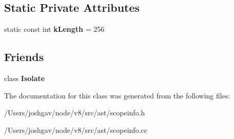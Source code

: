 \subsection*{Static Private Attributes}
\begin{DoxyCompactItemize}
\item 
static const int {\bfseries k\+Length} = 256\hypertarget{classv8_1_1internal_1_1_context_slot_cache_a86ccac5433f64d7cb0663564dd7d8ac3}{}\label{classv8_1_1internal_1_1_context_slot_cache_a86ccac5433f64d7cb0663564dd7d8ac3}

\end{DoxyCompactItemize}
\subsection*{Friends}
\begin{DoxyCompactItemize}
\item 
class {\bfseries Isolate}\hypertarget{classv8_1_1internal_1_1_context_slot_cache_aba4f0964bdacf2bbf62cf876e5d28d0a}{}\label{classv8_1_1internal_1_1_context_slot_cache_aba4f0964bdacf2bbf62cf876e5d28d0a}

\end{DoxyCompactItemize}


The documentation for this class was generated from the following files\+:\begin{DoxyCompactItemize}
\item 
/\+Users/joshgav/node/v8/src/ast/scopeinfo.\+h\item 
/\+Users/joshgav/node/v8/src/ast/scopeinfo.\+cc\end{DoxyCompactItemize}
